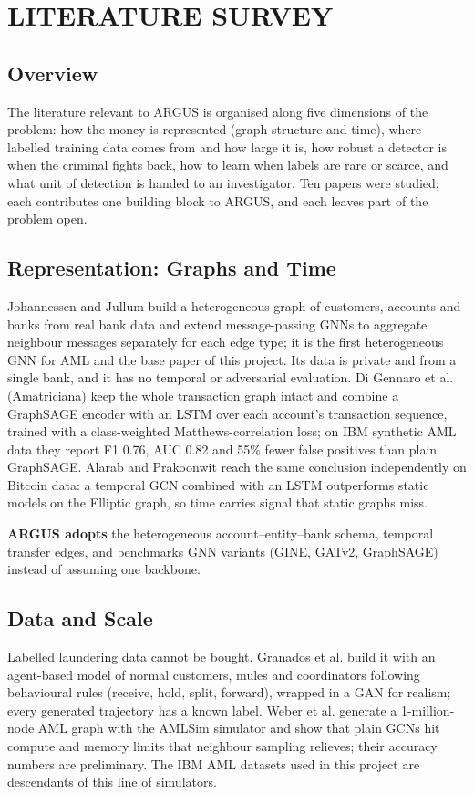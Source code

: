 \chapter{LITERATURE SURVEY}

\section{Overview}
The literature relevant to ARGUS is organised along five dimensions of the problem: how the money is represented (graph structure and time), where labelled training data comes from and how large it is, how robust a detector is when the criminal fights back, how to learn when labels are rare or scarce, and what unit of detection is handed to an investigator. Ten papers were studied; each contributes one building block to ARGUS, and each leaves part of the problem open.

\section{Representation: Graphs and Time}
Johannessen and Jullum \cite{johannessen2025finding} build a heterogeneous graph of customers, accounts and banks from real bank data and extend message-passing GNNs to aggregate neighbour messages separately for each edge type; it is the first heterogeneous GNN for AML and the base paper of this project. Its data is private and from a single bank, and it has no temporal or adversarial evaluation. Di Gennaro et al. \cite{digennaro2024amatriciana} (Amatriciana) keep the whole transaction graph intact and combine a GraphSAGE encoder with an LSTM over each account's transaction sequence, trained with a class-weighted Matthews-correlation loss; on IBM synthetic AML data they report F1 0.76, AUC 0.82 and 55\% fewer false positives than plain GraphSAGE. Alarab and Prakoonwit \cite{alarab2023graph} reach the same conclusion independently on Bitcoin data: a temporal GCN combined with an LSTM outperforms static models on the Elliptic graph, so time carries signal that static graphs miss.

\textbf{ARGUS adopts} the heterogeneous account--entity--bank schema, temporal transfer edges, and benchmarks GNN variants (GINE, GATv2, GraphSAGE) instead of assuming one backbone.

\section{Data and Scale}
Labelled laundering data cannot be bought. Granados et al. \cite{granados2024gan} build it with an agent-based model of normal customers, mules and coordinators following behavioural rules (receive, hold, split, forward), wrapped in a GAN for realism; every generated trajectory has a known label. Weber et al. \cite{weber2018scalable} generate a 1-million-node AML graph with the AMLSim simulator and show that plain GCNs hit compute and memory limits that neighbour sampling relieves; their accuracy numbers are preliminary. The IBM AML datasets \cite{altman2023realistic} used in this project are descendants of this line of simulators.

